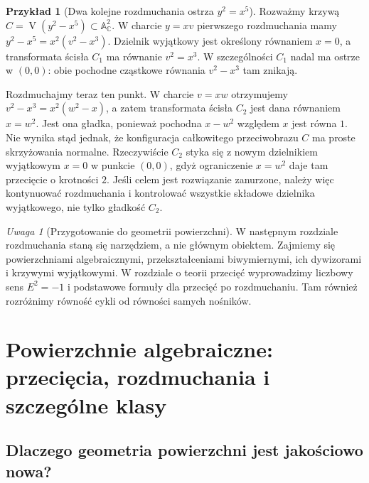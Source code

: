 \documentclass[11pt,a4paper,openany]{report}
\numberwithin{equation}{section}
\theoremstyle{plain}
\theoremstyle{definition}
\newtheorem{przyklad}[twierdzenie]{Przykład}
\theoremstyle{remark}
\newtheorem{uwaga}[twierdzenie]{Uwaga}
\newcommand{\C}{\mathbb C}
\newcommand{\A}{\mathbb A}
\newcommand{\V}{\operatorname V}
\begin{document}
\begin{przyklad}[Dwa kolejne rozdmuchania ostrza $y^2=x^5$]
Rozważmy krzywą $C=\V(y^2-x^5)\subset\A^2_{\C}$.
W charcie $y=xv$ pierwszego rozdmuchania mamy
$y^2-x^5=x^2(v^2-x^3)$. Dzielnik wyjątkowy jest
określony równaniem $x=0$, a transformata ścisła
$C_1$ ma równanie $v^2=x^3$. W szczególności
$C_1$ nadal ma ostrze w $(0,0)$: obie pochodne
cząstkowe równania $v^2-x^3$ tam znikają.

Rozdmuchajmy teraz ten punkt. W charcie $v=xw$
otrzymujemy $v^2-x^3=x^2(w^2-x)$, a zatem
transformata ścisła $C_2$ jest dana równaniem
$x=w^2$. Jest ona gładka, ponieważ pochodna
$x-w^2$ względem $x$ jest równa $1$.
Nie wynika stąd jednak, że konfiguracja całkowitego
przeciwobrazu $C$ ma proste skrzyżowania normalne.
Rzeczywiście $C_2$ styka się z nowym dzielnikiem
wyjątkowym $x=0$ w punkcie $(0,0)$, gdyż ograniczenie
$x=w^2$ daje tam przecięcie o krotności $2$.
Jeśli celem jest rozwiązanie zanurzone, należy więc
kontynuować rozdmuchania i kontrolować wszystkie
składowe dzielnika wyjątkowego, nie tylko gładkość $C_2$.
\end{przyklad}

\begin{uwaga}[Przygotowanie do geometrii powierzchni]
W następnym rozdziale rozdmuchania staną się
narzędziem, a nie głównym obiektem. Zajmiemy się
powierzchniami algebraicznymi, przekształceniami
biwymiernymi, ich dywizorami i krzywymi wyjątkowymi.
W rozdziale o teorii przecięć wyprowadzimy
liczbowy sens $E^2=-1$ i podstawowe formuły
dla przecięć po rozdmuchaniu. Tam również rozróżnimy
równość cykli od równości samych nośników.
\end{uwaga}



\chapter{Powierzchnie algebraiczne: przecięcia, rozdmuchania i szczególne klasy}
\label{ch:ga6-powierzchnie}

\section{Dlaczego geometria powierzchni jest jakościowo nowa?}
\label{sec:ga6-motywacja}
\end{document}

